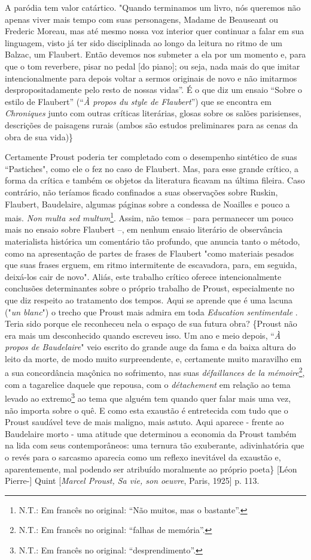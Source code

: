A paródia tem valor catártico. "Quando terminamos um livro, nós queremos
não apenas viver mais tempo com suas personagens, Madame de Beauseant ou
Frederic Moreau, mas até mesmo nossa voz interior quer continuar a falar
em sua linguagem, visto já ter sido disciplinada ao longo da leitura no
ritmo de um Balzac, um Flaubert. Então devemos nos submeter a ela por um
momento e, para que o tom reverbere, pisar no pedal {[}do piano{]}; ou
seja, nada mais do que imitar intencionalmente para depois voltar a
sermos originais de novo e não imitarmos despropositadamente pelo resto
de nossas vidas''. É o que diz um ensaio ``Sobre o estilo de Flaubert''
(``\emph{À propos du style de Flaubert}'') que se encontra em
\emph{Chroniques} junto com outras críticas literárias, glosas sobre os
salões parisienses, descrições de paisagens rurais (ambos são estudos
preliminares para as cenas da obra de sua vida)\}

Certamente Proust poderia ter completado com o desempenho sintético de
suas ``Pastiches", como ele o fez no caso de Flaubert. Mas, para esse
grande crítico, a forma da crítica e também os objetos da literatura
ficavam na última fileira. Caso contrário, não teríamos ficado
confinados a suas observações sobre Ruskin, Flaubert, Baudelaire,
algumas páginas sobre a condessa de Noailles e pouco a mais. \emph{Non
multa sed multum}\footnote{N.T.: Em francês no original: ``Não muitos,
  mas o bastante''.}. Assim, não temos -- para permanecer um pouco mais
no ensaio sobre Flaubert --, em nenhum ensaio literário de observância
materialista histórica um comentário tão profundo, que anuncia tanto o
método, como na apresentação de partes de frases de Flaubert "como
materiais pesados que suas frases erguem, em ritmo intermitente de
escavadora, para, em seguida, deixá-los cair de novo". Aliás, este
trabalho crítico oferece intencionalmente conclusões determinantes sobre
o próprio trabalho de Proust, especialmente no que diz respeito ao
tratamento dos tempos. Aqui se aprende que é uma lacuna ("\emph{un
blanc}") o trecho que Proust mais admira em toda \emph{Education
sentimentale} . Teria sido porque ele reconheceu nela o espaço de sua
futura obra? \{Proust não era mais um desconhecido quando escreveu isso.
Um ano e meio depois, ``\emph{À propos de Baudelaire}" veio escrito do
grande auge da fama e da baixa altura do leito da morte, de modo muito
surpreendente, e, certamente muito maravilho em a sua concordância
maçônica no sofrimento, nas suas \emph{défaillances de la
mémoire}\footnote{N.T.: Em francês no original: ``falhas de memória''.},
com a tagarelice daquele que repousa, com o \emph{détachement} em
relação ao tema levado ao extremo\footnote{N.T.: Em francês no original:
  ``desprendimento''.} ao tema que alguém tem quando quer falar mais uma
vez, não importa sobre o quê. E como esta exaustão é entretecida com
tudo que o Proust saudável teve de mais maligno, mais astuto. Aqui
aparece - frente ao Baudelaire morto - uma atitude que determinou a
economia da Proust também na lida com seus contemporâneos: uma ternura
tão exuberante, adivinhatória que o revés para o sarcasmo aparecia como
um reflexo inevitável da exaustão e, aparentemente, mal podendo ser
atribuído moralmente ao próprio poeta\} {[}Léon Pierre-{]} Quint
{[}\emph{Marcel Proust, Sa vie, son oeuvre}, Paris, 1925{]} p. 113.


